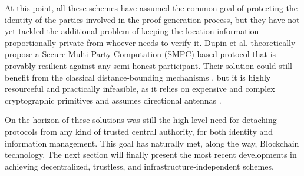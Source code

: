 At this point, all these schemes have assumed the common goal of protecting the identity of the parties involved in the proof generation process, but they have not yet tackled the additional problem of keeping the location information proportionally private from whoever needs to verify it. Dupin et al. \cite{dupin2018location} theoretically propose a Secure Multi-Party Computation (SMPC) based protocol that is provably resilient against any semi-honest participant. Their solution could still benefit from the classical distance-bounding mechanisms \cite{dupin2018location}, but it is highly resourceful and practically infeasible, as it relies on expensive and complex cryptographic primitives and assumes directional antennas \cite{yang2021group}.

On the horizon of these solutions was still the high level need for detaching \pol{} protocols from any kind of trusted central authority, for both identity and information management. This goal has naturally met, along the way, Blockchain technology. The next section will finally present the most recent developments in achieving decentralized, trustless, and infrastructure-independent \pol{} schemes.
